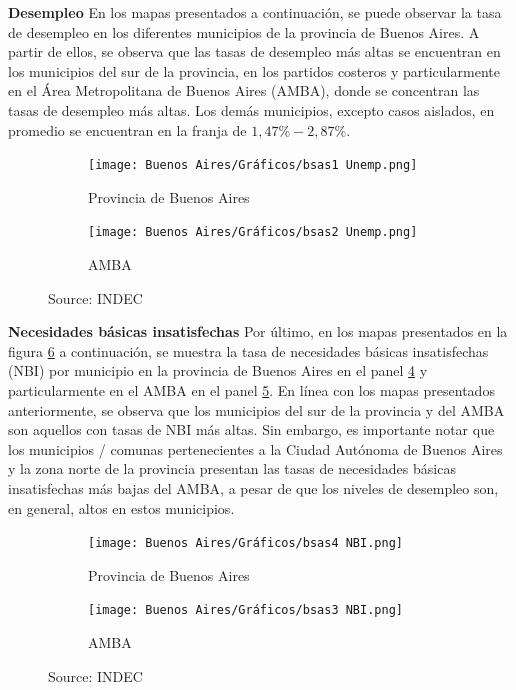 \documentclass[11pt]{article}
\newcommand{\source}[1]{\caption*{Source: {#1}} }
\begin{document}
\textbf{Desempleo}
En los mapas presentados a continuación, se puede observar la tasa de desempleo en los diferentes municipios de la provincia de Buenos Aires. A partir de ellos, se observa que las tasas de desempleo más altas se encuentran en los municipios del sur de la provincia, en los partidos costeros y particularmente en el Área Metropolitana de Buenos Aires (AMBA), donde se concentran las tasas de desempleo más altas. Los demás municipios, excepto casos aislados, en promedio se encuentran en la franja de $1,47\%-2,87\%$.
\vspace{0.25cm}
\begin{figure}[H]
\caption{Tasa de desempleo}
\begin{subfigure}{.5\textwidth}
  \centering
  \texttt{[image: Buenos Aires/Gráficos/bsas1 Unemp.png]}  
  \caption{Provincia de Buenos Aires}
  \label{fig:7a}
\end{subfigure}
\begin{subfigure}{.5\textwidth}
  \centering
  \texttt{[image: Buenos Aires/Gráficos/bsas2 Unemp.png]}
  \caption{AMBA}
  \label{fig:7b}
\end{subfigure}
\label{fig:7}
\source{INDEC}
\end{figure}

\newpage
\textbf{Necesidades básicas insatisfechas} 
Por último, en los mapas presentados en la figura \ref{fig:8} a continuación, se muestra la tasa de necesidades básicas insatisfechas (NBI) por municipio en la provincia de Buenos Aires en el panel \ref{fig:8a} y particularmente en el AMBA en el panel \ref{fig:8b}. En línea con los mapas presentados anteriormente, se observa que los municipios del sur de la provincia y del AMBA son aquellos con tasas de NBI más altas. Sin embargo, es importante notar que los municipios / comunas pertenecientes a la Ciudad Autónoma de Buenos Aires y la zona norte de la provincia presentan las tasas de necesidades básicas insatisfechas más bajas del AMBA, a pesar de que los niveles de desempleo son, en general, altos en estos municipios. 

\begin{figure}[H]
\caption{Necesidades Básicas Insatisfechas}
\begin{subfigure}{.5\textwidth}
  \centering
  \texttt{[image: Buenos Aires/Gráficos/bsas4 NBI.png]}  
  \caption{Provincia de Buenos Aires}
  \label{fig:8a}
\end{subfigure}
\begin{subfigure}{.5\textwidth}
  \centering
  \texttt{[image: Buenos Aires/Gráficos/bsas3 NBI.png]}
  \caption{AMBA}
  \label{fig:8b}
\end{subfigure}
\label{fig:8}
\source{INDEC}
\end{figure}
\end{document}
